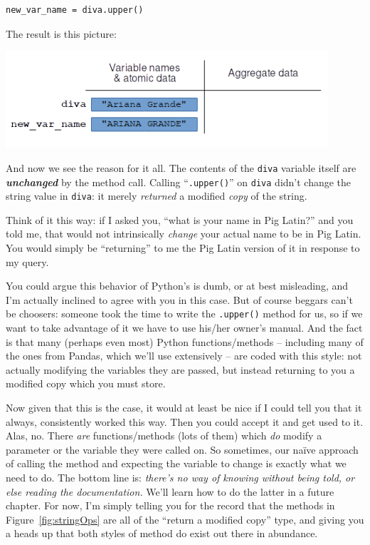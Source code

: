 \begin{Verbatim}[fontsize=\small,samepage=true,frame=single,framesep=3mm]
new_var_name = diva.upper()
\end{Verbatim}

The result is this picture:

\vspace{-.2in}
\begin{center}
\includegraphics[width=0.9\textwidth]{bomb2.png}
\end{center}

And now we see the reason for it all. The contents of the \texttt{diva}
variable itself are \textit{\textbf{unchanged}} by the method call. Calling
``\texttt{.upper()}'' on \texttt{diva} didn't change the string value in
\texttt{diva}: it merely \textit{returned} a modified \textit{copy} of the
string.

Think of it this way: if I asked you, ``what is your name in Pig Latin?'' and
you told me, that would not intrinsically \textit{change} your actual name to
be in Pig Latin. You would simply be ``returning'' to me the Pig Latin version
of it in response to my query.

You could argue this behavior of Python's is dumb, or at best misleading, and
I'm actually inclined to agree with you in this case. But of course beggars
can't be choosers: someone took the time to write the \texttt{.upper()} method
for us, so if we want to take advantage of it we have to use his/her owner's
manual. And the fact is that many (perhaps even most) Python functions/methods
-- including many of the ones from Pandas, which we'll use extensively -- are
coded with this style: not actually modifying the variables they are passed,
but instead returning to you a modified copy which you must store.

Now given that this is the case, it would at least be nice if I could tell you
that it always, consistently worked this way. Then you could accept it and get
used to it. Alas, no. There \textit{are} functions/methods (lots of them) which
\textit{do} modify a parameter or the variable they were called on. So
sometimes, our na\"{i}ve approach of calling the method and expecting the
variable to change is exactly what we need to do. The bottom line is:
\textit{there's no way of knowing without being told, or else reading the
documentation.} We'll learn how to do the latter in a future chapter. For now,
I'm simply telling you for the record that the methods in
Figure~\ref{fig:stringOps} are all of the ``return a modified copy'' type, and
giving you a heads up that both styles of method do exist out there in
abundance.

